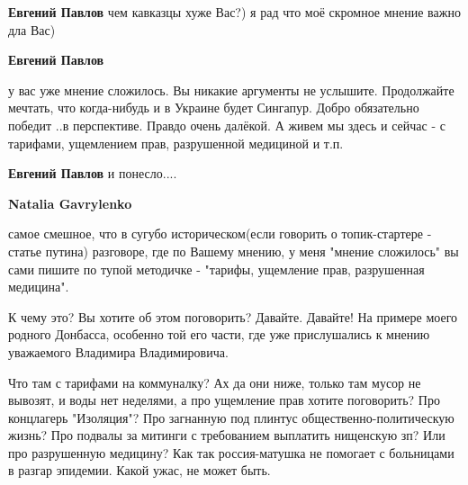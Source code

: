 \begin{itemize}
\begin{itemize}
 
\textbf{Евгений Павлов} чем кавказцы хуже Вас?) я рад что моё скромное мнение важно дла Вас)

 
\textbf{Евгений Павлов} 

у вас уже мнение сложилось. Вы никакие аргументы не услышите. Продолжайте
мечтать, что когда-нибудь и в Украине будет Сингапур. Добро обязательно победит
..в перспективе. Правдо очень далёкой. А живем мы здесь и сейчас - с тарифами,
ущемлением прав, разрушенной медициной и т.п.


 
\textbf{Евгений Павлов} и понесло....

 
\textbf{Natalia Gavrylenko} 

самое смешное, что в сугубо историческом(если говорить о топик-стартере -
статье путина) разговоре, где по Вашему мнению, у меня "мнение сложилось" вы
сами пишите по тупой методичке - "тарифы, ущемление прав, разрушенная
медицина". 

К чему это? Вы хотите об этом поговорить? Давайте. Давайте! На примере моего
родного Донбасса, особенно той его части, где уже прислушались к мнению
уважаемого Владимира Владимировича. 

Что там с тарифами на коммуналку? Ах да они ниже, только там мусор не вывозят,
и воды нет неделями, а про ущемление прав хотите поговорить? Про концлагерь
"Изоляция"? Про загнанную под плинтус общественно-политическую жизнь? Про
подвалы за митинги с требованием выплатить нищенскую зп? Или про разрушенную
медицину? Как так россия-матушка не помогает с больницами в разгар эпидемии.
Какой ужас, не может быть. 


\end{itemize}
\end{itemize}
